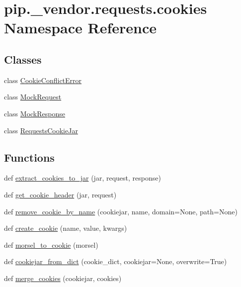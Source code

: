 \hypertarget{namespacepip_1_1__vendor_1_1requests_1_1cookies}{}\section{pip.\+\_\+vendor.\+requests.\+cookies Namespace Reference}
\label{namespacepip_1_1__vendor_1_1requests_1_1cookies}
\subsection*{Classes}
\begin{DoxyCompactItemize}
\item 
class \hyperlink{classpip_1_1__vendor_1_1requests_1_1cookies_1_1CookieConflictError}{Cookie\+Conflict\+Error}
\item 
class \hyperlink{classpip_1_1__vendor_1_1requests_1_1cookies_1_1MockRequest}{Mock\+Request}
\item 
class \hyperlink{classpip_1_1__vendor_1_1requests_1_1cookies_1_1MockResponse}{Mock\+Response}
\item 
class \hyperlink{classpip_1_1__vendor_1_1requests_1_1cookies_1_1RequestsCookieJar}{Requests\+Cookie\+Jar}
\end{DoxyCompactItemize}
\subsection*{Functions}
\begin{DoxyCompactItemize}
\item 
def \hyperlink{namespacepip_1_1__vendor_1_1requests_1_1cookies_abc928d5e92aa070fc82f0f2fe72b9623}{extract\+\_\+cookies\+\_\+to\+\_\+jar} (jar, request, response)
\item 
def \hyperlink{namespacepip_1_1__vendor_1_1requests_1_1cookies_a27286c78be1686546e6305b4928cdcc1}{get\+\_\+cookie\+\_\+header} (jar, request)
\item 
def \hyperlink{namespacepip_1_1__vendor_1_1requests_1_1cookies_a05b3875ddaca8156cc9d6396a286c345}{remove\+\_\+cookie\+\_\+by\+\_\+name} (cookiejar, name, domain=None, path=None)
\item 
def \hyperlink{namespacepip_1_1__vendor_1_1requests_1_1cookies_ac97dc5eec2b7eb65c19f4b765074cc84}{create\+\_\+cookie} (name, value, kwargs)
\item 
def \hyperlink{namespacepip_1_1__vendor_1_1requests_1_1cookies_a16d4078d6417c36bb680beebac684d0d}{morsel\+\_\+to\+\_\+cookie} (morsel)
\item 
def \hyperlink{namespacepip_1_1__vendor_1_1requests_1_1cookies_abf7f7a7f3d49a7ebbf612ebfe497df33}{cookiejar\+\_\+from\+\_\+dict} (cookie\+\_\+dict, cookiejar=None, overwrite=True)
\item 
def \hyperlink{namespacepip_1_1__vendor_1_1requests_1_1cookies_afd7e21f17ae60f422857d8f169c9c41f}{merge\+\_\+cookies} (cookiejar, cookies)
\end{DoxyCompactItemize}


